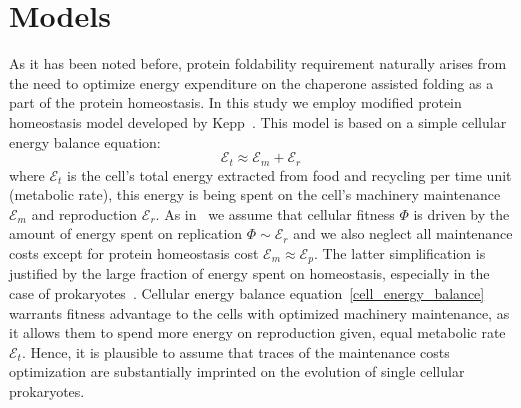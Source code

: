 \documentclass[10pt,letterpaper]{article}
\begin{document}
\section*{Models}
As it has been noted before, protein foldability requirement naturally arises from the need to optimize energy expenditure on the chaperone assisted folding as a part of the protein homeostasis. In this study we employ modified protein homeostasis model developed by Kepp~\cite{Kepp2014Model}. This model is based on a simple cellular energy balance equation:
\begin{equation}
	\label{cell_energy_balance}
	\mathcal{E}_{t} \approx \mathcal{E}_{m} + \mathcal{E}_{r}
\end{equation}
where $\mathcal{E}_{t}$ is the cell's total energy extracted from food and recycling per time unit (metabolic rate), this energy is being spent on the cell's machinery maintenance $\mathcal{E}_{m}$ and reproduction $\mathcal{E}_{r}$. As in~\cite{Kepp2014Model} we assume that cellular fitness $\Phi$ is driven by the amount of energy spent on replication $\Phi \sim \mathcal{E}_{r}$ and we also neglect all maintenance costs except for protein homeostasis cost $\mathcal{E}_{m}\approx\mathcal{E}_{p}$. The latter simplification is justified by the large fraction of energy spent on homeostasis, especially in the case of prokaryotes~\cite{Harold1987Vital}. Cellular energy balance equation~\eqref{cell_energy_balance} warrants fitness advantage to the cells with optimized machinery maintenance, as it allows them to spend more energy on reproduction given, equal metabolic rate $\mathcal{E}_{t}$. Hence, it is plausible to assume that traces of the maintenance costs optimization are substantially imprinted on the evolution of single cellular prokaryotes.
\end{document}
